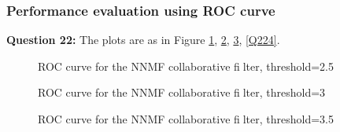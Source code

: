 \documentclass{article}
\begin{document}
\subsubsection{Performance evaluation using ROC curve}

\bigbreak \textbf{Question 22:}
The plots are as in Figure \ref{Q221}, \ref{Q222}, \ref{Q223}, \ref{Q224}.
\begin{figure}
\centering
{}
\caption{ROC curve for the NNMF collaborative filter, threshold=2.5} \label{Q221}
\end{figure}

\begin{figure}
\centering
{}
\caption{ROC curve for the NNMF collaborative filter, threshold=3} \label{Q222}
\end{figure}

\begin{figure}
\centering
{}
\caption{ROC curve for the NNMF collaborative filter, threshold=3.5} \label{Q223}
\end{figure}
\end{document}
